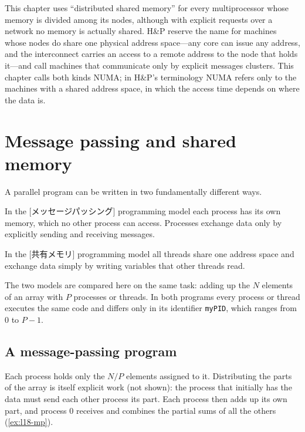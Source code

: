 \documentclass[../main.tex]{subfiles}
\begin{document}
\begin{note}[Terminology]
  This chapter uses \enquote{distributed shared memory} for every
  multiprocessor whose memory is divided among its nodes, although
  with explicit requests over a network no memory is actually shared.  H\&P
  reserve the name for machines whose nodes do share one physical address
  space---any core can issue any address, and the interconnect carries an
  access to a remote address to the node that holds it---and call machines
  that communicate only by explicit messages clusters.  This chapter calls
  both kinds NUMA; in H\&P's terminology NUMA refers only to the machines
  with a shared address space, in which the access time depends on where the
  data is.
\end{note}

\section{Message passing and shared memory}
\label{sec:l18-programs}

A parallel program can be written in two fundamentally different
ways.

\begin{definition}
  In the [メッセージパッシング] programming model
  each process has its own memory, which no other process can access.
  Processes exchange data only by explicitly sending and receiving messages.
\end{definition}

\begin{definition}
  In the [共有メモリ] programming model all threads
  share one address space and exchange data simply by writing variables
  that other threads read.
\end{definition}

The two models are compared here on the same task: adding up the $N$
elements of an array with $P$ processes or threads.  In both programs every
process or thread executes the same code and differs only in its
identifier \texttt{myPID}, which ranges from 0 to $P-1$.

\subsection{A message-passing program}

Each process holds only the $N/P$ elements assigned to it.  Distributing
the parts of the array is itself explicit work (not shown): the process
that initially has the data must send each other process its part.  Each
process then adds up its own part, and process 0 receives and combines the
partial sums of all the others (\cref{ex:l18-mp}).
\end{document}
